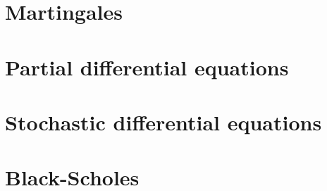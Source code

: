 \documentclass[a4paper, 12pt]{article}
\theoremstyle{problemstyle}
\begin{document}
\section{Martingales}

\section{Partial differential equations}

\section{Stochastic differential equations}

\section{Black-Scholes}
\end{document}
